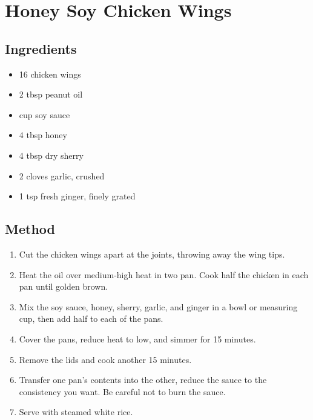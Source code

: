 \section{Honey Soy Chicken Wings}


  \begin{multicols}{2}
    \subsection{Ingredients}
      \begin{itemize}
        \item 16 chicken wings
        \item 2 tbsp peanut oil
        \item {} cup soy sauce
        \item 4 tbsp honey
        \item 4 tbsp dry sherry
        \item 2 cloves garlic, crushed
        \item 1 tsp fresh ginger, finely grated
      \end{itemize}
      \vfill\null
    \columnbreak
    \subsection{Method}
      \begin{enumerate}
        \item Cut the chicken wings apart at the joints, throwing away the wing tips.
        \item Heat the oil over medium-high heat in two pan. Cook half the chicken in each pan until golden brown.
        \item Mix the soy sauce, honey, sherry, garlic, and ginger in a bowl or measuring cup, then add half to each of the pans.
        \item Cover the pans, reduce heat to low, and simmer for 15 minutes.
        \item Remove the lids and cook another 15 minutes.
        \item Transfer one pan's contents into the other, reduce the sauce to the consistency you want. Be careful not to burn the sauce.
        \item Serve with steamed white rice.
      \end{enumerate}
  \end{multicols}
